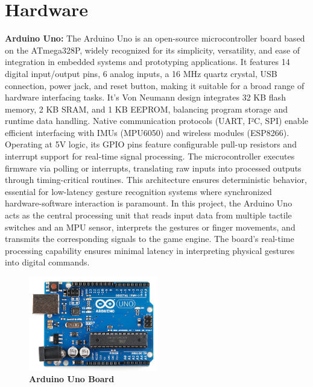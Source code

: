 \section{Hardware}
\textbf{Arduino Uno:} The Arduino Uno is an open-source microcontroller board based on the ATmega328P, widely recognized for its simplicity, versatility, and ease of integration in embedded systems and prototyping applications. It features 14 digital input/output pins, 6 analog inputs, a 16 MHz quartz crystal, USB connection, power jack, and reset button, making it suitable for a broad range of hardware interfacing tasks. It's Von Neumann design integrates 32 KB flash memory, 2 KB SRAM, and 1 KB EEPROM, balancing program storage and runtime data handling. Native communication protocols (UART, I²C, SPI) enable efficient interfacing with IMUs (MPU6050) and wireless modules (ESP8266). Operating at 5V logic, its GPIO pins feature configurable pull-up resistors and interrupt support for real-time signal processing. The microcontroller executes firmware via polling or interrupts, translating raw inputs into processed outputs through timing-critical routines. This architecture ensures deterministic behavior, essential for low-latency gesture recognition systems where synchronized hardware-software interaction is paramount. 
 In this project, the Arduino Uno acts as the central processing unit that reads input data from multiple tactile switches and an MPU sensor, interprets the gestures or finger movements, and transmits the corresponding signals to the game engine. The board's real-time processing capability ensures minimal latency in interpreting physical gestures into digital commands. 
\begin{figure}[htbp!]
\centering
\includegraphics[width=0.5\textwidth]{images/fig3.1.png}
\caption{\textbf{Arduino Uno Board}}
\label{fig:3.1}
\end{figure}

\vspace{1.5\baselineskip} %

